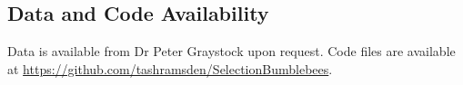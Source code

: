 \documentclass[12pt]{article}
\begin{document}
\begin{linenumbers}
		



    
  
    \section{Data and Code Availability}
    
    Data is available from Dr Peter Graystock upon request. Code files are available at \linebreak \url{https://github.com/tashramsden/SelectionBumblebees}.
    
  
  	

     

    \end{linenumbers}    
\end{document}
